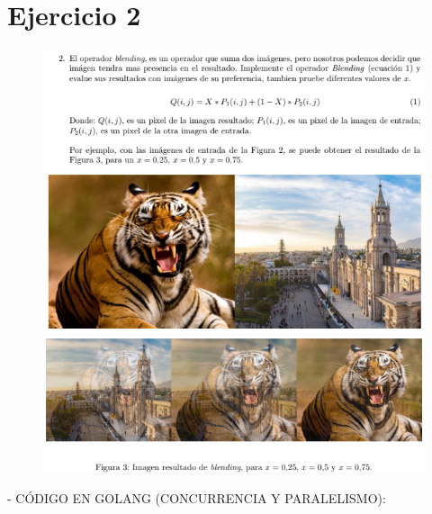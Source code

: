 \documentclass{article}
\begin{document}
\section{Ejercicio 2}
\begin{figure}[h]
\centering
\includegraphics[scale=1]{EJ2A.png}
\includegraphics[scale=1]{EJ2B.png}
\end{figure}
- CÓDIGO EN GOLANG (CONCURRENCIA Y PARALELISMO):
\end{document}

